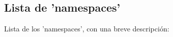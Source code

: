 \subsection{Lista de 'namespaces'}
Lista de los 'namespaces', con una breve descripción\-:\begin{DoxyCompactList}
\item{}
\end{DoxyCompactList}
